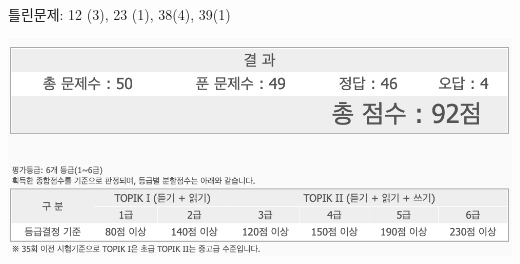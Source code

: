 \documentclass[12pt]{article}
\begin{document}
틀린문제: 12 (3), 23 (1), 38(4), 39(1)

\bigskip

    \begin{center}
    \includegraphics[width=\linewidth]{images/2019_result.png}
    \end{center}









\end{document}
